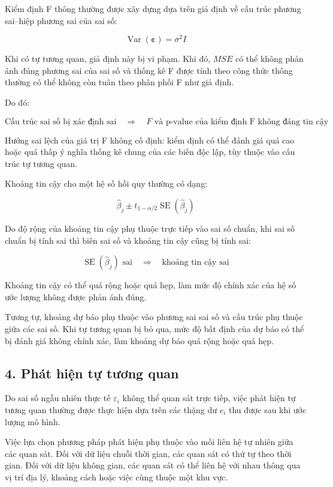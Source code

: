Kiểm định F thông thường được xây dựng dựa trên giả định về cấu trúc phương sai--hiệp phương sai của sai số:

\[
\operatorname{Var}(\boldsymbol{\varepsilon})
=
\sigma^2 I
\]

Khi có tự tương quan, giả định này bị vi phạm. Khi đó, $MSE$ có thể không phản ánh đúng phương sai của sai số và thống kê F được tính theo công thức thông thường có thể không còn tuân theo phân phối F như giả định.

Do đó:

\[
\text{Cấu trúc sai số bị xác định sai}
\quad \Rightarrow \quad
F\text{ và p-value của kiểm định F không đáng tin cậy}
\]

Hướng sai lệch của giá trị F không cố định: kiểm định có thể đánh giá quá cao hoặc quá thấp ý nghĩa thống kê chung của các biến độc lập, tùy thuộc vào cấu trúc tự tương quan.

Khoảng tin cậy cho một hệ số hồi quy thường có dạng:

\[
\hat{\beta}_j
\pm
t_{1-\alpha/2}
\operatorname{SE}(\hat{\beta}_j)
\]

Do độ rộng của khoảng tin cậy phụ thuộc trực tiếp vào sai số chuẩn, khi sai số chuẩn bị tính sai thì biên sai số và khoảng tin cậy cũng bị tính sai:

\[
\operatorname{SE}(\hat{\beta}_j)
\text{ sai}
\quad \Rightarrow \quad
\text{khoảng tin cậy sai}
\]

Khoảng tin cậy có thể quá rộng hoặc quá hẹp, làm mức độ chính xác của hệ số ước lượng không được phản ánh đúng.

Tương tự, khoảng dự báo phụ thuộc vào phương sai sai số và cấu trúc phụ thuộc giữa các sai số. Khi tự tương quan bị bỏ qua, mức độ bất định của dự báo có thể bị đánh giá không chính xác, làm khoảng dự báo quá rộng hoặc quá hẹp.


\subsection{4. Phát hiện tự tương quan}

Do sai số ngẫu nhiên thực tế $\varepsilon_i$ không thể quan sát trực tiếp, việc phát hiện tự tương quan thường được thực hiện dựa trên các thặng dư $e_i$ thu được sau khi ước lượng mô hình.

Việc lựa chọn phương pháp phát hiện phụ thuộc vào mối liên hệ tự nhiên giữa các quan sát. Đối với dữ liệu chuỗi thời gian, các quan sát có thứ tự theo thời gian. Đối với dữ liệu không gian, các quan sát có thể liên hệ với nhau thông qua vị trí địa lý, khoảng cách hoặc việc cùng thuộc một khu vực.

